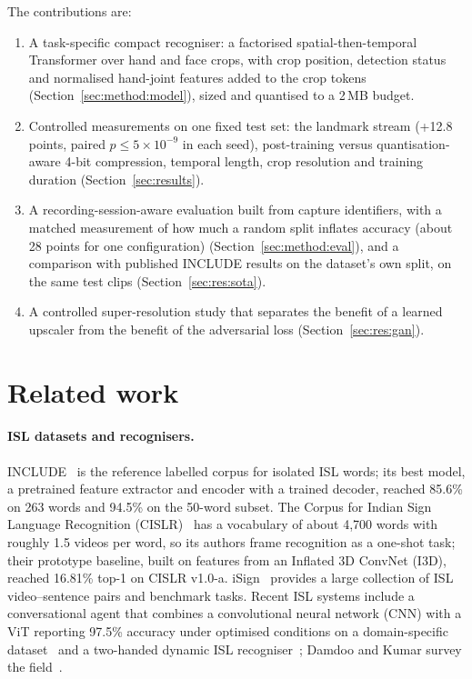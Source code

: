 \documentclass[pdflatex,sn-mathphys-num,twocolumn,lineno]{sn-jnl}
\theoremstyle{thmstyleone}%
\begin{document}
The contributions are:
\begin{enumerate}
\item A task-specific compact recogniser: a factorised spatial-then-temporal Transformer over hand and face crops, with crop position, detection status and normalised hand-joint features added to the crop tokens (Section~\ref{sec:method:model}), sized and quantised to a 2\,MB budget.
\item Controlled measurements on one fixed test set: the landmark stream (+12.8 points, paired $p\le 5\times10^{-9}$ in each seed), post-training versus quantisation-aware 4-bit compression, temporal length, crop resolution and training duration (Section~\ref{sec:results}).
\item A recording-session-aware evaluation built from capture identifiers, with a matched measurement of how much a random split inflates accuracy (about 28 points for one configuration) (Section~\ref{sec:method:eval}), and a comparison with published INCLUDE results on the dataset's own split, on the same test clips (Section~\ref{sec:res:sota}).
\item A controlled super-resolution study that separates the benefit of a learned upscaler from the benefit of the adversarial loss (Section~\ref{sec:res:gan}).
\end{enumerate}

\section{Related work}\label{sec:related}

\paragraph{ISL datasets and recognisers.} INCLUDE~\cite{sridhar2020include} is the reference labelled corpus for isolated ISL words; its best model, a pretrained feature extractor and encoder with a trained decoder, reached 85.6\% on 263 words and 94.5\% on the 50-word subset. The Corpus for Indian Sign Language Recognition (CISLR)~\cite{joshi2022cislr} has a vocabulary of about 4,700 words with roughly 1.5 videos per word, so its authors frame recognition as a one-shot task; their prototype baseline, built on features from an Inflated 3D ConvNet (I3D), reached 16.81\% top-1 on CISLR v1.0-a. iSign~\cite{joshi2024isign} provides a large collection of ISL video--sentence pairs and benchmark tasks. Recent ISL systems include a conversational agent that combines a convolutional neural network (CNN) with a ViT reporting 97.5\% accuracy under optimised conditions on a domain-specific dataset~\cite{nedungadi2025vit} and a two-handed dynamic ISL recogniser~\cite{govindharajalu2025isl}; Damdoo and Kumar survey the field~\cite{damdoo2025survey}.
\end{document}
